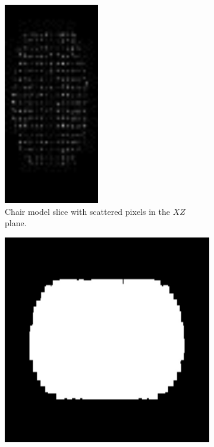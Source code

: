 \begin{figure}[!t]
	\centering
	\begin{subfigure}[t]{0.35\linewidth}
		\centering
		\includegraphics[width=\linewidth, height=\linewidth]{Figures/ObjRecog/slices/bathtub_original}
        \caption{Chair model slice with scattered pixels in the $XZ$ plane.}
        \label{fig:dilation_a}
	\end{subfigure}
	\quad
	\begin{subfigure}[t]{0.35\linewidth}
		\centering
		\includegraphics[width=\linewidth, height=\linewidth]{Figures/ObjRecog/slices/bathtub_dilated}

\end{subfigure}
\end{figure}
